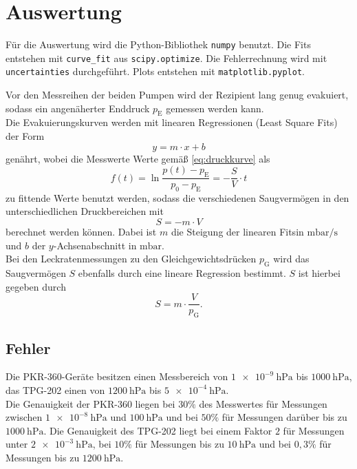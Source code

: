 \section{Auswertung}
\label{sec:Auswertung}

Für die Auswertung wird die Python-Bibliothek \texttt{numpy} benutzt. Die Fits entstehen mit \texttt{curve\_fit} aus \texttt{scipy.optimize}.
Die Fehlerrechnung wird mit \texttt{uncertainties} durchgeführt. Plots entstehen mit \texttt{matplotlib.pyplot}.

Vor den Messreihen der beiden Pumpen wird der Rezipient lang genug evakuiert, sodass ein angenäherter Enddruck $p_\text{E}$ gemessen werden kann. \\
Die Evakuierungskurven werden mit linearen Regressionen (Least Square Fits) der Form
\begin{equation}
    y = m \cdot x + b
\end{equation}
genährt, wobei die Messwerte Werte gemäß \eqref{eq:druckkurve} als
\begin{equation}
    f(t) = \ln{\frac{p(t) - p_\text{E}}{p_0 - p_\text{E}}} = -\frac{S}{V} \cdot t
    \label{eq:linfit}
\end{equation}
zu fittende Werte benutzt werden, sodass die verschiedenen Saugvermögen in den unterschiedlichen Druckbereichen mit
\begin{equation}
    S = -m \cdot V
    \label{eq:S_evak}
\end{equation}
berechnet werden können. Dabei ist $m$ die Steigung der linearen Fitsin $\si{\milli\bar\per\second}$ und $b$ der $y$-Achsenabschnitt in $\si{\milli\bar}$.\\
Bei den Leckratenmessungen zu den Gleichgewichtsdrücken $p_\text{G}$ wird das Saugvermögen $S$ ebenfalls durch eine lineare Regression bestimmt.
$S$ ist hierbei gegeben durch
\begin{equation}
    S = m \cdot \frac{V}{p_\text{G}}.
    \label{eq:S_leck}
\end{equation}

\subsection{Fehler}

Die PKR-360-Geräte besitzen einen Messbereich von $\qty{1e-9}{\hecto\pascal}$ bis $\qty{1000}{\hecto\pascal}$,
das TPG-202 einen von $\qty{1200}{\hecto\pascal}$ bis $\qty{5e-4}{\hecto\pascal}$.\\
Die Genauigkeit der PKR-360 liegen bei $30 \%$ des Messwertes für Messungen zwischen $\qty{1e-8}{\hecto\pascal}$ und $\qty{100}{\hecto\pascal}$
und bei $50 \%$ für Messungen darüber bis zu $\qty{1000}{\hecto\pascal}$.
Die Genauigkeit des TPG-202 liegt bei einem Faktor $2$ für Messungen unter $\qty{2e-3}{\hecto\pascal}$, bei $10 \%$ für Messungen bis zu $\qty{10}{\hecto\pascal}$
und bei $0,3 \%$ für Messungen bis zu $\qty{1200}{\hecto\pascal}$. \cite{delta_tu_dortmund}


